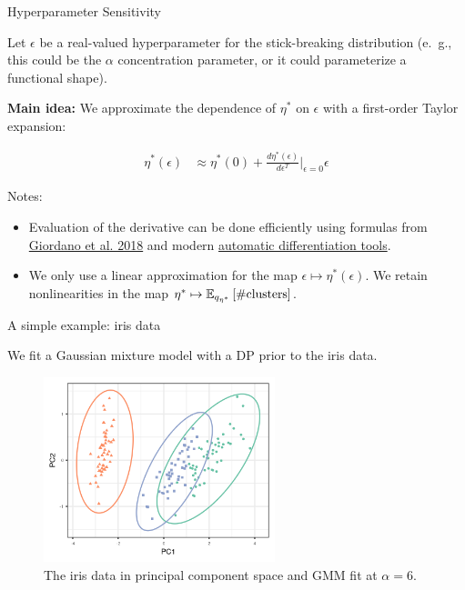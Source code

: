 \begin{frame}{Hyperparameter Sensitivity}

Let $\epsilon$ be a real-valued hyperparameter for the stick-breaking distribution
(e.\ g., this could be the $\alpha$ concentration parameter, or it could parameterize a functional shape).

\pause

{\bf Main idea: } We approximate the dependence of $\eta^*$ on $\epsilon$ with a first-order
Taylor expansion:

\begin{align*}
  \eta^*(\epsilon)  &\approx  \eta^*(0) +
  \frac{d \eta^*(\epsilon)}{d\epsilon^T}\Big|_{\epsilon=0} \epsilon
\end{align*}

\pause

Notes:
\begin{itemize}
\item Evaluation of the derivative can be done efficiently using formulas from
{\color{blue} \href{https://arxiv.org/abs/1709.02536}{Giordano et al. 2018}}
and modern
{\color{blue} \href{https://jax.readthedocs.io/en/latest/}{automatic differentiation tools}}.

\item We only use a linear approximation for the map $\epsilon \mapsto \eta^*(\epsilon)$. We retain nonlinearities in the map $\eta^* \mapsto
\mathbb{E}_{q_{\eta^*}} \left[ \#\text{clusters} \right]$.

\end{itemize}
\end{frame}

\begin{frame}{A simple example: iris data}

We fit a Gaussian mixture model with a DP prior to
the iris data.

\begin{figure}[!h]
  \centering
  \includegraphics[width = 0.6\textwidth]{./figures/iris_init_fit.png}
  \caption*{The iris data in principal component space and GMM fit at $\alpha = 6$.}
\end{figure}

\end{frame}


